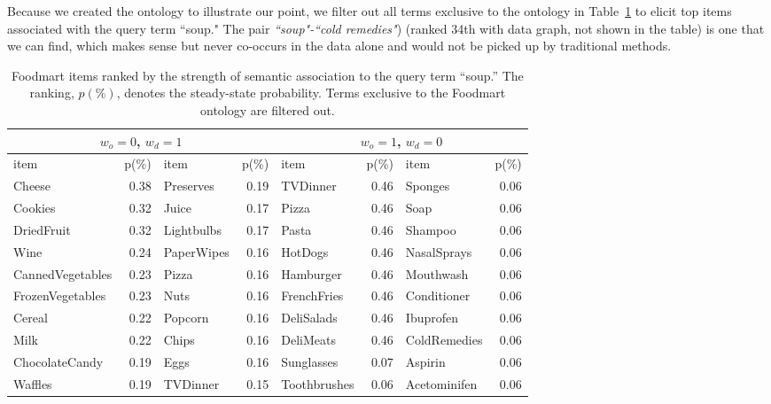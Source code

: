 Because we created the ontology to illustrate our point, we filter out all terms exclusive to the ontology in Table~\ref{tbl:foodmart_comp2} to elicit top items associated with the query term ``soup."   The pair \emph{``soup"-``cold remedies"}) (ranked 34th with data graph, not shown in the table) is one that we can find, which makes sense but never co-occurs in the data alone and would not be picked up by traditional methods.




\begin{table}[tbh]\scriptsize
\begin{center}
\begin{tabular}{ l r | l r || l r | l r }
\hline
\multicolumn{4}{c||}{$w_o=0$, $w_d=1$}  &   \multicolumn{4}{c}{$w_o=1$, $w_d=0$}\\
\hline
item	&	p(\%)	&	item	&	p(\%)	&	item	&	p(\%)	&	item	&	p(\%)	\\
\hline
Cheese	&	0.38	&	Preserves	&	0.19	&	TVDinner	&	0.46	&	Sponges	&	0.06	\\
Cookies	&	0.32	&	Juice	&	0.17	&	Pizza	&	0.46	&	Soap	&	0.06	\\
DriedFruit	&	0.32	&	Lightbulbs	&	0.17	&	Pasta	&	0.46	&	Shampoo	&	0.06	\\
Wine	&	0.24	&	PaperWipes	&	0.16	&	HotDogs	&	0.46	&	NasalSprays	&	0.06	\\
CannedVegetables	&	0.23	&	Pizza	&	0.16	&	Hamburger	&	0.46	&	Mouthwash	&	0.06	\\
FrozenVegetables	&	0.23	&	Nuts	&	0.16	&	FrenchFries	&	0.46	&	Conditioner	&	0.06	\\
Cereal	&	0.22	&	Popcorn	&	0.16	&	DeliSalads	&	0.46	&	Ibuprofen	&	0.06	\\
Milk	&	0.22	&	Chips	&	0.16	&	DeliMeats	&	0.46	&	ColdRemedies	&	0.06	\\
ChocolateCandy	&	0.19	&	Eggs	&	0.16	&	Sunglasses	&	0.07	&	Aspirin	&	0.06	\\
Waffles	&	0.19	&	TVDinner	&	0.15	&	Toothbrushes	&	0.06	&	Acetominifen	&	0.06	\\					
\hline
\end{tabular}
\end{center}
\caption{\label{tbl:foodmart_comp2} Foodmart items ranked by the strength of semantic association to the query term ``soup.'' The ranking, $p(\%)$, denotes the steady-state probability. Terms exclusive to the Foodmart ontology are filtered out.}
\end{table}



